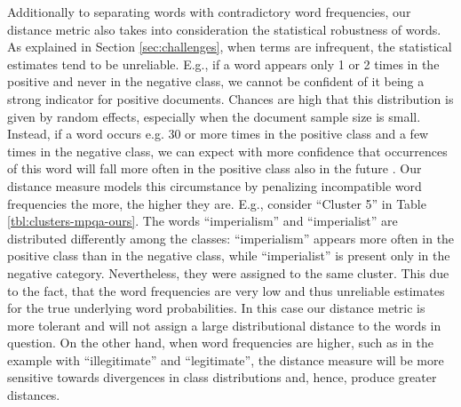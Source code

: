 Additionally to separating words with contradictory word frequencies, our
distance metric also takes into consideration the statistical robustness of
words. As explained in Section \ref{sec:challenges}, when terms are infrequent,
the statistical estimates tend to be unreliable. E.g., if a word appears only 1
or 2 times in the positive and never in the negative class, we
cannot be confident of it being a strong indicator for positive documents.
Chances are high that this distribution is given by random effects, especially
when the document sample size is small. Instead, if a word occurs e.g.
30 or more times in the positive class and a few times in the negative class, 
we can expect with more confidence that occurrences of this word will fall more
often in the positive class also in the future \cite{agresti1998approximate}. Our distance
measure models this circumstance by penalizing incompatible word frequencies
the more, the higher they are. E.g., consider ``Cluster 5'' in Table
\ref{tbl:clusters-mpqa-ours}.
The words ``imperialism'' and ``imperialist'' are distributed differently among
the classes: ``imperialism'' appears more often in the positive class than in the negative 
class, while ``imperialist'' is present only in the negative category.
Nevertheless, they were assigned to the same cluster.
This due to the fact, that the word frequencies are very low and thus unreliable
estimates for the true underlying word probabilities. In this case our distance metric is
more tolerant and will not assign a large distributional distance to the words
in question. On the other hand, when word frequencies are higher,
such as in the example with ``illegitimate'' and ``legitimate'',
the distance measure will be more sensitive towards divergences in class
distributions and, hence, produce greater distances. 

